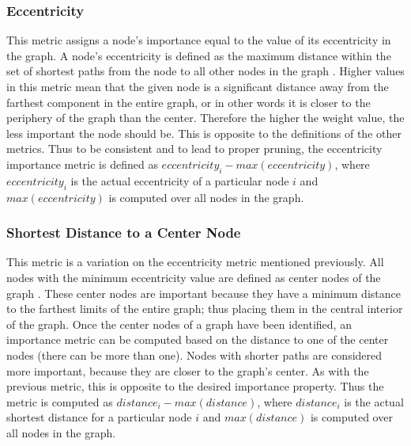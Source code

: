 \subsubsection{Eccentricity}
This metric assigns a node's importance equal to the value of its eccentricity in the graph.  A node's eccentricity is defined as the maximum distance within the set of shortest paths from the node to all other nodes in the graph \cite{Har69}.  Higher values in this metric mean that the given node is a significant distance away from the farthest component in the entire graph, or in other words it is closer to the periphery of the graph than the center.  Therefore the higher the weight value, the less important the node should be.  This is opposite to the definitions of the other metrics.  Thus to be consistent and to lead to proper pruning, the eccentricity importance metric is defined as $eccentricity_i - max(eccentricity)$, where $eccentricity_i$ is the actual eccentricity of a particular node $i$ and $max(eccentricity)$ is computed over all nodes in the graph.

\subsubsection{Shortest Distance to a Center Node}
This metric is a variation on the eccentricity metric mentioned previously.  All nodes with the minimum eccentricity value are defined as center nodes of the graph \cite{Har69}.  These center nodes are important because they have a minimum distance to the farthest limits of the entire graph; thus placing them in the central interior of the graph. Once the center nodes of a graph have been identified, an importance metric can be computed based on the distance to one of the center nodes (there can be more than one).  Nodes with shorter paths are considered more important, because they are closer to the graph's center.  As with the previous metric, this is opposite to the desired importance property. Thus the metric is computed as $distance_i - max(distance)$, where $distance_i$ is the actual shortest distance for a particular node $i$ and $max(distance)$ is computed over all nodes in the graph.



